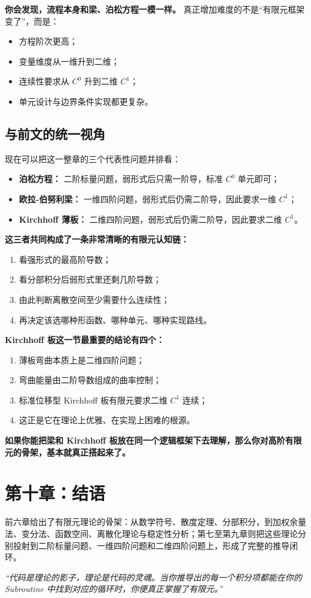 \documentclass[11pt, a4paper, UTF8]{ctexart}
\begin{document}
\textbf{你会发现，流程本身和梁、泊松方程一模一样。}
真正增加难度的不是“有限元框架变了”，而是：
\begin{itemize}
    \item 方程阶次更高；
    \item 变量维度从一维升到二维；
    \item 连续性要求从 $C^0$ 升到二维 $C^1$；
    \item 单元设计与边界条件实现都更复杂。
\end{itemize}

\subsection{与前文的统一视角}
现在可以把这一整章的三个代表性问题并排看：
\begin{itemize}
    \item \textbf{泊松方程：} 二阶标量问题，弱形式后只需一阶导，标准 $C^0$ 单元即可；
    \item \textbf{欧拉-伯努利梁：} 一维四阶问题，弱形式后仍需二阶导，因此要求一维 $C^1$；
    \item \textbf{Kirchhoff 薄板：} 二维四阶问题，弱形式后仍需二阶导，因此要求二维 $C^1$。
\end{itemize}

\textbf{这三者共同构成了一条非常清晰的有限元认知链：}
\begin{enumerate}
    \item 看强形式的最高阶导数；
    \item 看分部积分后弱形式里还剩几阶导数；
    \item 由此判断离散空间至少需要什么连续性；
    \item 再决定该选哪种形函数、哪种单元、哪种实现路线。
\end{enumerate}

\textbf{Kirchhoff 板这一节最重要的结论有四个：}
\begin{enumerate}
    \item 薄板弯曲本质上是二维四阶问题；
    \item 弯曲能量由二阶导数组成的曲率控制；
    \item 标准位移型 Kirchhoff 板有限元要求二维 $C^1$ 连续；
    \item 这正是它在理论上优雅、在实现上困难的根源。
\end{enumerate}

\textbf{如果你能把梁和 Kirchhoff 板放在同一个逻辑框架下去理解，那么你对高阶有限元的骨架，基本就真正搭起来了。}

\section{第十章：结语}
前六章给出了有限元理论的骨架：从数学符号、散度定理、分部积分，到加权余量法、变分法、函数空间、离散化理论与稳定性分析；第七至第九章则把这些理论分别投射到二阶标量问题、一维四阶问题和二维四阶问题上，形成了完整的推导闭环。

\textit{“代码是理论的影子，理论是代码的灵魂。当你推导出的每一个积分项都能在你的 Subroutine 中找到对应的循环时，你便真正掌握了有限元。”}
\end{document}
